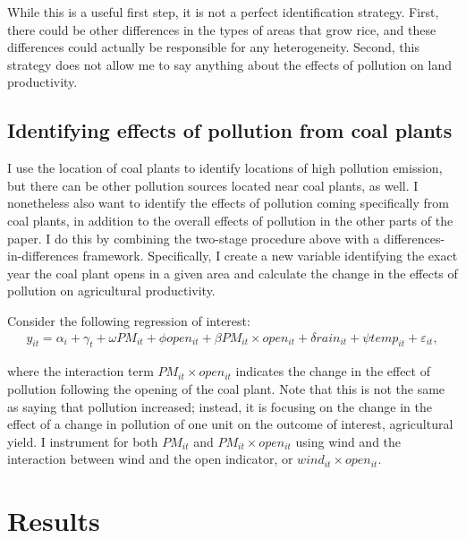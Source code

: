\documentclass[
]{article}
\begin{document}
While this is a useful first step, it is not a perfect identification strategy. First, there could be other differences in the types of areas that grow rice, and these differences could actually be responsible for any heterogeneity. Second, this strategy does not allow me to say anything about the effects of pollution on land productivity.

\hypertarget{identifying-effects-of-pollution-from-coal-plants}{%
\subsection{Identifying effects of pollution from coal plants}\label{identifying-effects-of-pollution-from-coal-plants}}

I use the location of coal plants to identify locations of high pollution emission, but there can be other pollution sources located near coal plants, as well. I nonetheless also want to identify the effects of pollution coming specifically from coal plants, in addition to the overall effects of pollution in the other parts of the paper. I do this by combining the two-stage procedure above with a differences-in-differences framework. Specifically, I create a new variable identifying the exact year the coal plant opens in a given area and calculate the change in the effects of pollution on agricultural productivity.

Consider the following regression of interest:
\begin{gather} 
y_{it} = \alpha_{i} + \gamma_{t} + \omega PM_{it} + \phi open_{it} + \beta PM_{it}\times open_{it} + \delta rain_{it} + \psi temp_{it} + \varepsilon_{it},
\end{gather}

where the interaction term \(PM_{it}\times open_{it}\) indicates the change in the effect of pollution following the opening of the coal plant. Note that this is not the same as saying that pollution increased; instead, it is focusing on the change in the effect of a change in pollution of one unit on the outcome of interest, agricultural yield. I instrument for both \(PM_{it}\) and \(PM_{it}\times open_{it}\) using wind and the interaction between wind and the open indicator, or \(wind_{it}\times open_{it}\).

\hypertarget{results}{%
\section{Results}\label{results}}
\end{document}
